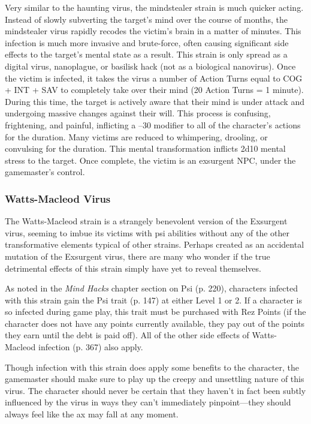 Very similar to the haunting virus, the mindstealer strain is much quicker acting. Instead of slowly subverting the target's mind over the course of months, the mindstealer virus rapidly recodes the victim's brain in a matter of minutes. This infection is much more invasive and brute-force, often causing significant side effects to the target's mental state as a result. This strain is only spread as a digital virus, nanoplague, or basilisk hack (not as a biological nanovirus). Once the victim is infected, it takes the virus a number of Action Turns equal to COG + INT + SAV to completely take over their mind (20 Action Turns = 1 minute). During this time, the target is actively aware that their mind is under attack and undergoing massive changes against their will. This process is confusing, frightening, and painful, inflicting a –30 modifier to all of the character's actions for the duration. Many victims are reduced to whimpering, drooling, or convulsing for the duration. This mental transformation inflicts 2d10 mental stress to the target. Once complete, the victim is an exsurgent NPC, under the gamemaster's control. 



\subsubsection{Watts-Macleod Virus} 

The Watts-Macleod strain is a strangely benevolent version of the Exsurgent virus, seeming to imbue its victims with psi abilities without any of the other transformative elements typical of other strains. Perhaps created as an accidental mutation of the Exsurgent virus, there are many who wonder if the true detrimental effects of this strain simply have yet to reveal themselves. 

As noted in the \textit{Mind Hacks} chapter section on Psi (p. 220), characters infected with this strain gain the Psi trait (p. 147) at either Level 1 or 2. If a character is so infected during game play, this trait must be purchased with Rez Points (if the character does not have any points currently available, they pay out of the points they earn until the debt is paid off). All of the other side effects of Watts-Macleod infection (p. 367) also apply. 

Though infection with this strain does apply some benefits to the character, the gamemaster should make sure to play up the creepy and unsettling nature of this virus. The character should never be certain that they haven't in fact been subtly influenced by the virus in ways they can't immediately pinpoint—they should always feel like the ax may fall at any moment. 

